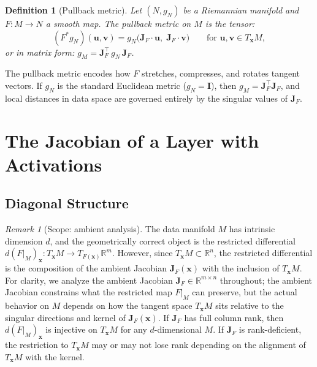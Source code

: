 \documentclass[11pt,a4paper]{article}
\newtheorem{definition}[theorem]{Definition}
\theoremstyle{remark}
\newtheorem{remark}{Remark}
\begin{document}
\begin{definition}[Pullback metric]
\label{def:pullback}
Let $(N, g_N)$ be a Riemannian manifold and $F: M \to N$ a smooth map.
The \emph{pullback metric} on $M$ is the tensor:
\begin{equation}
  (F^* g_N)(\mathbf{u}, \mathbf{v}) = g_N\bigl(\mathbf{J}_F \cdot \mathbf{u},\; \mathbf{J}_F \cdot \mathbf{v}\bigr) \qquad \text{for } \mathbf{u}, \mathbf{v} \in T_{\mathbf{x}} M,
  \label{eq:pullback}
\end{equation}
or in matrix form: $g_M = \mathbf{J}_F^\top \, g_N \, \mathbf{J}_F$.
\end{definition}

The pullback metric encodes how $F$ stretches, compresses, and rotates tangent vectors.
If $g_N$ is the standard Euclidean metric ($g_N = \mathbf{I}$), then $g_M = \mathbf{J}_F^\top \mathbf{J}_F$, and local distances in data space are governed entirely by the singular values of $\mathbf{J}_F$.

\section{The Jacobian of a Layer with Activations}
\label{sec:jacobian}

\subsection{Diagonal Structure}

\begin{remark}[Scope: ambient analysis]
\label{rem:scope}
The data manifold $M$ has intrinsic dimension $d$, and the geometrically correct object is the restricted differential $d(F|_M)_{\mathbf{x}}: T_{\mathbf{x}}M \to T_{F(\mathbf{x})}\mathbb{R}^m$.
However, since $T_{\mathbf{x}}M \subset \mathbb{R}^n$, the restricted differential is the composition of the ambient Jacobian $\mathbf{J}_F(\mathbf{x})$ with the inclusion of $T_{\mathbf{x}}M$.
For clarity, we analyze the ambient Jacobian $\mathbf{J}_F \in \mathbb{R}^{m \times n}$ throughout; the ambient Jacobian constrains what the restricted map $F|_M$ can preserve, but the actual behavior on $M$ depends on how the tangent space $T_{\mathbf{x}}M$ sits relative to the singular directions and kernel of $\mathbf{J}_F(\mathbf{x})$.
If $\mathbf{J}_F$ has full column rank, then $d(F|_M)_{\mathbf{x}}$ is injective on $T_{\mathbf{x}}M$ for any $d$-dimensional $M$.
If $\mathbf{J}_F$ is rank-deficient, the restriction to $T_{\mathbf{x}}M$ may or may not lose rank depending on the alignment of $T_{\mathbf{x}}M$ with the kernel.
\end{remark}
\end{document}

